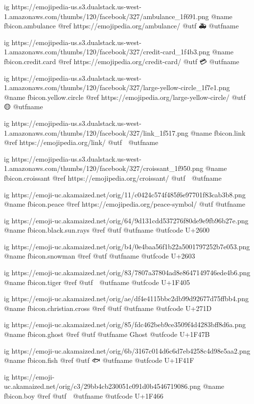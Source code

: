 	ig https://emojipedia-us.s3.dualstack.us-west-1.amazonaws.com/thumbs/120/facebook/327/ambulance_1f691.png
	@name fbicon.ambulance
	@ref https://emojipedia.org/ambulance/
	@utf 🚑
	@utfname

	ig https://emojipedia-us.s3.dualstack.us-west-1.amazonaws.com/thumbs/120/facebook/327/credit-card_1f4b3.png
	@name fbicon.credit.card
	@ref https://emojipedia.org/credit-card/
	@utf 💳
	@utfname

	ig https://emojipedia-us.s3.dualstack.us-west-1.amazonaws.com/thumbs/120/facebook/327/large-yellow-circle_1f7e1.png
	@name fbicon.yellow.circle
	@ref https://emojipedia.org/large-yellow-circle/
	@utf 🟡
	@utfname

	ig https://emojipedia-us.s3.dualstack.us-west-1.amazonaws.com/thumbs/120/facebook/327/link_1f517.png
	@name fbicon.link
	@ref https://emojipedia.org/link/
	@utf 🔗
	@utfname

	ig https://emojipedia-us.s3.dualstack.us-west-1.amazonaws.com/thumbs/120/facebook/327/croissant_1f950.png
	@name fbicon.croissant
	@ref https://emojipedia.org/croissant/
	@utf 🥐
	@utfname

	ig https://emoji-uc.akamaized.net/orig/11/c0424c574f485f6e97701f83cab3b8.png
	@name fbicon.peace
	@ref https://emojipedia.org/peace-symbol/
	@utf
	@utfname

	ig https://emoji-uc.akamaized.net/orig/64/9d131cdd537276f80de9e9fb96b27e.png
	@name fbicon.black.sun.rays
	@ref
	@utf
	@utfname
	@utfcode U+2600

	ig https://emoji-uc.akamaized.net/orig/b4/0e4baa56f1b22a5001797252b7e053.png
	@name fbicon.snowman
	@ref
	@utf
	@utfname
	@utfcode U+2603

	ig https://emoji-uc.akamaized.net/orig/83/7807a37804ad8e8647149746ede4b6.png
	@name fbicon.tiger
	@ref
	@utf 🐅
	@utfname
	@utfcode U+1F405

	ig https://emoji-uc.akamaized.net/orig/ae/df4e4115bbc2db99d92677d75ffbb4.png
	@name fbicon.christian.cross
	@ref
	@utf
	@utfname
	@utfcode U+271D

	ig https://emoji-uc.akamaized.net/orig/85/fdc462beb9ce3509f4d4283bff8d6a.png
	@name fbicon.ghost
	@ref
	@utf
	@utfname Ghost
	@utfcode U+1F47B

	ig https://emoji-uc.akamaized.net/orig/6b/3167c014d6c6d7eb4258c4d98e5aa2.png
	@name fbicon.fish
	@ref
	@utf 🐟
	@utfname
	@utfcode U+1F41F

	ig https://emoji-uc.akamaized.net/orig/c3/29bb4cb230051c091d0b4546719086.png
	@name fbicon.boy
	@ref
	@utf 👦
	@utfname
	@utfcode U+1F466

